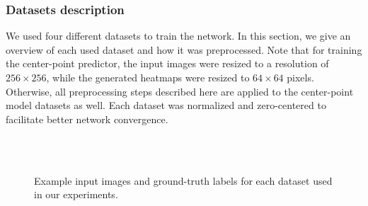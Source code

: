     \subsubsection{Datasets description}

We used four different datasets to train the network. In this section, we give an overview of each used dataset and how it was preprocessed. Note that for training the center-point predictor, the input images were resized to a resolution of $256 \times 256$, while the generated heatmaps were resized to $64 \times 64$ pixels. Otherwise, all preprocessing steps described here are applied to the center-point model datasets as well. Each dataset was normalized and zero-centered to facilitate better network convergence. 

	\begin{figure}
	\hfill
	 \\
	\hfill
	 \\
	\caption{Example input images and ground-truth labels for each dataset used in our experiments. \cite{bencevicTrainingPolarImage2021}}
	\label{fig:datasets}
	\end{figure}


